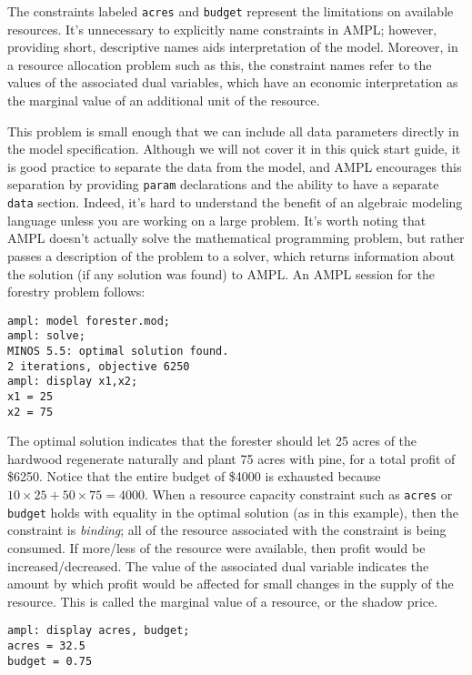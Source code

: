 \documentclass[12pt]{book}
\begin{document}
The constraints labeled \texttt{acres} and \texttt{budget} represent
the limitations on available resources.  It's unnecessary to
explicitly name constraints in AMPL; however, providing short,
descriptive names aids interpretation of the model. Moreover, in a
resource allocation problem such as this, the constraint names refer
to the values of the associated dual variables, which have an economic
interpretation as the marginal value of an additional unit of the
resource.

This problem is small enough that we can include all data parameters
directly in the model specification. Although we will not cover it in
this quick start guide, it is good practice to separate the data from
the model, and AMPL encourages this separation by providing
\texttt{param} declarations and the ability to have a separate
\texttt{data} section. Indeed, it's hard to understand the benefit of
an algebraic modeling language unless you are working on a large
problem.  It's worth noting that AMPL doesn't actually solve the
mathematical programming problem, but rather passes a description of
the problem to a solver, which returns information about the solution
(if any solution was found) to AMPL. An AMPL session for the forestry
problem follows:

\begin{Verbatim}[samepage=true]
ampl: model forester.mod;
ampl: solve;
MINOS 5.5: optimal solution found.
2 iterations, objective 6250
ampl: display x1,x2;
x1 = 25
x2 = 75
\end{Verbatim}

The optimal solution indicates that the forester should let 25 acres
of the hardwood regenerate naturally and plant 75 acres with pine, for
a total profit of \$6250. Notice that the entire budget of \$4000 is
exhausted because $10 \times 25 + 50 \times 75 = 4000$. When a
resource capacity constraint such as \texttt{acres} or \texttt{budget}
holds with equality in the optimal solution (as in this example), then
the constraint is \emph{binding}; all of the resource associated with
the constraint is being consumed. If more/less of the resource were
available, then profit would be increased/decreased. The value of the
associated dual variable indicates the amount by which profit would be
affected for small changes in the supply of the resource. This is
called the marginal value of a resource, or the shadow price.

\begin{Verbatim}[samepage=true]
ampl: display acres, budget;
acres = 32.5
budget = 0.75
\end{Verbatim}
\end{document}
